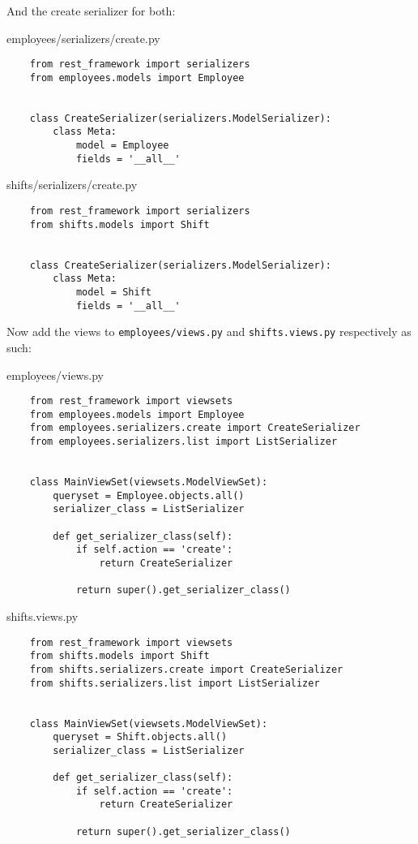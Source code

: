 And the create serializer for both:

employees/serializers/create.py
\begin{verbatim}
    from rest_framework import serializers
    from employees.models import Employee


    class CreateSerializer(serializers.ModelSerializer):
        class Meta:
            model = Employee
            fields = '__all__'

\end{verbatim}

shifts/serializers/create.py
\begin{verbatim}
    from rest_framework import serializers
    from shifts.models import Shift


    class CreateSerializer(serializers.ModelSerializer):
        class Meta:
            model = Shift
            fields = '__all__'

\end{verbatim}

Now add the views to \texttt{employees/views.py} and \texttt{shifts.views.py} respectively as such:

employees/views.py
\begin{verbatim}
    from rest_framework import viewsets
    from employees.models import Employee
    from employees.serializers.create import CreateSerializer
    from employees.serializers.list import ListSerializer


    class MainViewSet(viewsets.ModelViewSet):
        queryset = Employee.objects.all()
        serializer_class = ListSerializer

        def get_serializer_class(self):
            if self.action == 'create':
                return CreateSerializer

            return super().get_serializer_class()
\end{verbatim}

shifts.views.py
\begin{verbatim}
    from rest_framework import viewsets
    from shifts.models import Shift
    from shifts.serializers.create import CreateSerializer
    from shifts.serializers.list import ListSerializer


    class MainViewSet(viewsets.ModelViewSet):
        queryset = Shift.objects.all()
        serializer_class = ListSerializer

        def get_serializer_class(self):
            if self.action == 'create':
                return CreateSerializer

            return super().get_serializer_class()
\end{verbatim}

